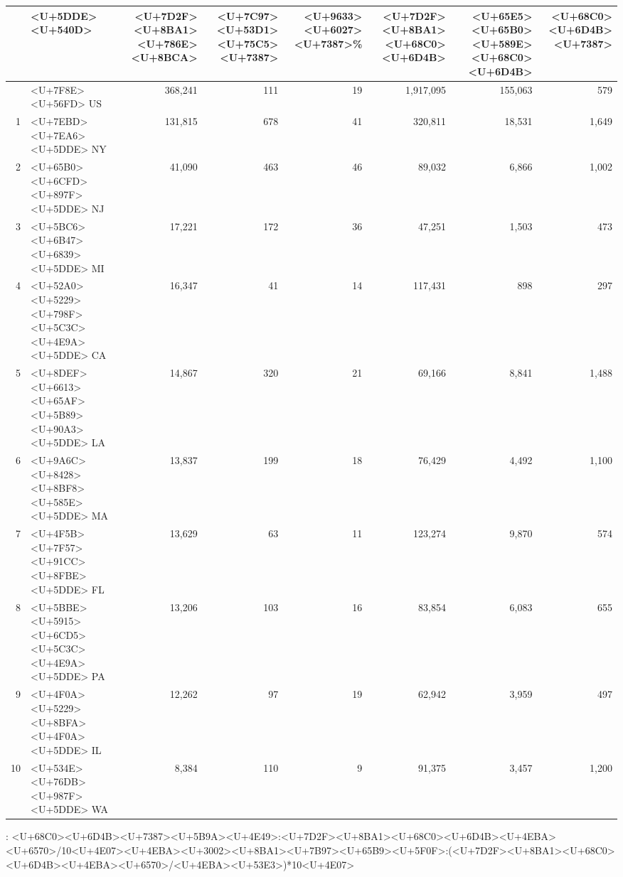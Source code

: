 \documentclass[
]{article}
\begin{document}
\begin{table}[H]
    \caption{<U+7F8E><U+56FD><U+7D2F><U+8BA1><U+786E><U+8BCA><U+524D><U+5341><U+4F4D><U+5DDE>}
      \vspace{-0.5\baselineskip}
      \centering \begin{table}[H]
\centering
\begin{tabular}{rlrrrrrr}
\toprule
  & <U+5DDE><U+540D> & <U+7D2F><U+8BA1><U+786E><U+8BCA> & <U+7C97><U+53D1><U+75C5><U+7387> & <U+9633><U+6027><U+7387>\% & <U+7D2F><U+8BA1><U+68C0><U+6D4B> & <U+65E5><U+65B0><U+589E><U+68C0><U+6D4B> & <U+68C0><U+6D4B><U+7387>\\
\midrule
\rowcolor{gray!6}   & <U+7F8E><U+56FD> US & 368,241 & 111 & 19 & 1,917,095 & 155,063 & 579\\
1 & <U+7EBD><U+7EA6><U+5DDE> NY & 131,815 & 678 & 41 & 320,811 & 18,531 & 1,649\\
\rowcolor{gray!6}  2 & <U+65B0><U+6CFD><U+897F><U+5DDE> NJ & 41,090 & 463 & 46 & 89,032 & 6,866 & 1,002\\
3 & <U+5BC6><U+6B47><U+6839><U+5DDE> MI & 17,221 & 172 & 36 & 47,251 & 1,503 & 473\\
\rowcolor{gray!6}  4 & <U+52A0><U+5229><U+798F><U+5C3C><U+4E9A><U+5DDE> CA & 16,347 & 41 & 14 & 117,431 & 898 & 297\\
5 & <U+8DEF><U+6613><U+65AF><U+5B89><U+90A3><U+5DDE> LA & 14,867 & 320 & 21 & 69,166 & 8,841 & 1,488\\
\rowcolor{gray!6}  6 & <U+9A6C><U+8428><U+8BF8><U+585E><U+5DDE> MA & 13,837 & 199 & 18 & 76,429 & 4,492 & 1,100\\
7 & <U+4F5B><U+7F57><U+91CC><U+8FBE><U+5DDE> FL & 13,629 & 63 & 11 & 123,274 & 9,870 & 574\\
\rowcolor{gray!6}  8 & <U+5BBE><U+5915><U+6CD5><U+5C3C><U+4E9A><U+5DDE> PA & 13,206 & 103 & 16 & 83,854 & 6,083 & 655\\
9 & <U+4F0A><U+5229><U+8BFA><U+4F0A><U+5DDE> IL & 12,262 & 97 & 19 & 62,942 & 3,959 & 497\\
\rowcolor{gray!6}  10 & <U+534E><U+76DB><U+987F><U+5DDE> WA & 8,384 & 110 & 9 & 91,375 & 3,457 & 1,200\\
\bottomrule
\end{tabular}
\end{table} \begin{tablenotes}
    \footnotesize
    \item <U+6CE8>: <U+68C0><U+6D4B><U+7387><U+5B9A><U+4E49>:<U+7D2F><U+8BA1><U+68C0><U+6D4B><U+4EBA><U+6570>/10<U+4E07><U+4EBA><U+3002><U+8BA1><U+7B97><U+65B9><U+5F0F>:(<U+7D2F><U+8BA1><U+68C0><U+6D4B><U+4EBA><U+6570>/<U+4EBA><U+53E3>)*10<U+4E07>
    \end{tablenotes}
    \end{table}
\end{document}
